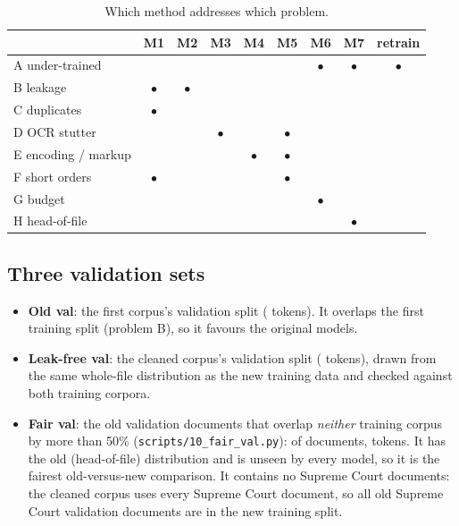 \documentclass[11pt,a4paper]{article}
\newcommand{\code}[1]{\texttt{\small #1}}
\begin{document}
\begin{table}[H]\centering\small
\caption{Which method addresses which problem.}\label{tab:map}
\begin{tabular}{l*{8}{c}}\toprule
& M1 & M2 & M3 & M4 & M5 & M6 & M7 & retrain\\\midrule
A under-trained & & & & & & $\bullet$ & $\bullet$ & $\bullet$\\
B leakage & $\bullet$ & $\bullet$ & & & & & & \\
C duplicates & $\bullet$ & & & & & & & \\
D OCR stutter & & & $\bullet$ & & $\bullet$ & & & \\
E encoding / markup & & & & $\bullet$ & $\bullet$ & & & \\
F short orders & $\bullet$ & & & & $\bullet$ & & & \\
G budget & & & & & & $\bullet$ & & \\
H head-of-file & & & & & & & $\bullet$ & \\
\bottomrule\end{tabular}\end{table}

\subsection{Three validation sets}\label{sec:valsets}
\begin{itemize}
  \item \textbf{Old val}: the first corpus's validation split (\oldvaltokens{} tokens).  It overlaps the first
  training split (problem B), so it favours the original models.
  \item \textbf{Leak-free val}: the cleaned corpus's validation split (\newvaltokens{} tokens), drawn from the
  same whole-file distribution as the new training data and checked against both training corpora.
  \item \textbf{Fair val}: the old validation documents that overlap \emph{neither} training corpus by more
  than 50\% (\code{scripts/10\_fair\_val.py}): \fairkept{} of \fairtotal{} documents, \fairtokens{} tokens.
  It has the old (head-of-file) distribution and is unseen by every model, so it is the fairest
  old-versus-new comparison.  It contains no Supreme Court documents: the cleaned corpus uses every Supreme
  Court document, so all old Supreme Court validation documents are in the new training split.
\end{itemize}
\end{document}
